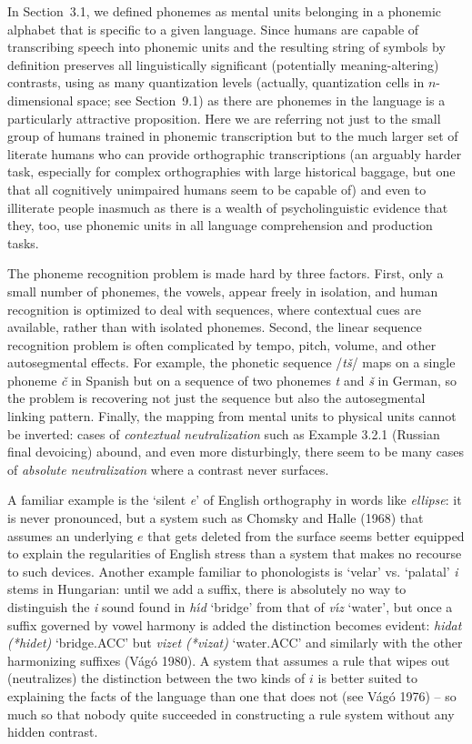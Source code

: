 In Section~3.1, we defined phonemes as mental units belonging in a phonemic
alphabet that is specific to a given language. Since humans are capable of
transcribing speech into phonemic units and the resulting string of symbols by
definition preserves all linguistically significant (potentially
meaning-altering) contrasts, using as many quantization levels (actually,
quantization cells in $n$-dimensional space; see Section~9.1) as there are
phonemes in the language is a particularly attractive proposition. Here we are
referring not just to the small group of humans trained in phonemic
transcription but to the much larger set of literate humans who can provide
orthographic transcriptions (an arguably harder task, especially for complex
orthographies with large historical baggage, but one that all cognitively
unimpaired humans seem to be capable of) and even to illiterate people
inasmuch as there is a wealth of psycholinguistic evidence that they, too, use
phonemic units in all language comprehension and production tasks.

The phoneme recognition problem is made hard by three factors. First, only a
small number of phonemes, the vowels, appear freely in isolation, and human
recognition is optimized to deal with sequences, where contextual cues are
available, rather than with isolated phonemes. Second, the linear sequence
recognition problem is often complicated by tempo, pitch, volume, and other
autosegmental effects. For example, the phonetic sequence /{\it t\v{s}}/ maps
on a single phoneme {\it \v{c}} in Spanish but on a sequence of two phonemes
{\it t} and {\it \v{s}} in German, so the problem is recovering not just the
sequence but also the autosegmental linking pattern. Finally, the mapping from
mental units to physical units cannot be inverted: cases of {\it contextual
  neutralization} such as Example 3.2.1 (Russian final devoicing) abound, and
even more disturbingly, there seem to be many cases of {\it absolute
  neutralization} where a contrast never surfaces.

A familiar example is the `silent {\it e}' of English orthography in words
like {\it ellipse}: it is never pronounced, but a system such as Chomsky and
Halle (1968) that assumes an underlying $e$ that gets deleted from the surface
seems better equipped to explain the regularities of English stress than a
system that makes no recourse to such devices.   Another
example familiar to phonologists is `velar' vs. `palatal' {\it i} stems in
Hungarian: until we add a suffix, there is absolutely no way to distinguish
the {\it i} sound found in {\it h\'{\i}d} `bridge' from that of {\it v\'{\i}z}
`water', but once a suffix governed by vowel harmony is added the distinction
becomes evident: {\it hidat (*hidet)} `bridge.ACC' but {\it vizet (*vizat)}
`water.ACC' and similarly with the other harmonizing suffixes (V\'ag\'o
1980). A system that assumes a rule that wipes out (neutralizes) the
distinction between the two kinds of $i$ is better suited to explaining the
facts of the language than one that does not (see V\'{a}g\'{o} 1976) -- so
much so that nobody quite succeeded in constructing a rule system without any
hidden contrast.\nocite{Va1go1:1976}

